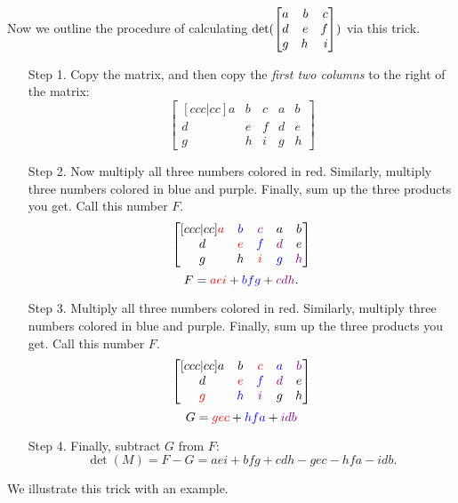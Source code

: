 Now we outline the procedure of calculating $\det(\mat{a & b & c \\ d & e & f \\ g & h & i}
)$ via this trick.

\begin{itemize}
	\item[Step 1. ] Copy the matrix, and then copy the \emph{first two columns} to
		the right of the matrix:
		\[
			\begin{bmatrix}
				[ccc|cc] a & b & c & a & b \\
				d          & e & f & d & e \\
				g          & h & i & g & h
			\end{bmatrix}
		\]

	\item[Step 2. ] Now multiply all three numbers colored in {\color{red} red}.
		Similarly, multiply three numbers colored in {\color{blue} blue} and {\color{violet} purple}.
		Finally, sum up the three products you get. Call this number $F$.
		\[
			\begin{bmatrix}
				[ccc|cc] {\color{red} a} & {\color{blue} b} & {\color{violet} c} & a                 & b                  \\
				d                        & {\color{red} e}  & {\color{blue} f}   & {\color{violet}d} & e                  \\
				g                        & h                & {\color{red} i}    & {\color{blue} g}  & {\color{violet} h}
			\end{bmatrix}
		\]
		\[
			F={\color{red} aei}+{\color{blue} bfg}+{\color{violet} cdh}.
		\]

	\item[Step 3. ] Multiply all three numbers colored in {\color{red} red}.
		Similarly, multiply three numbers colored in {\color{blue} blue} and {\color{violet} purple}.
		Finally, sum up the three products you get. Call this number $F$.
		\[
			\begin{bmatrix}
				[ccc|cc] a     & b               & {\color{red}c}    & {\color{blue} a}   & {\color{violet} b} \\
				d              & {\color{red}e}  & {\color{blue}f}   & {\color{violet} d} & e                  \\
				{\color{red}g} & {\color{blue}h} & {\color{violet}i} & g                  & h
			\end{bmatrix}
		\]
		\[
			G={\color{red} gec}+{\color{blue} hfa}+{\color{violet} idb}
		\]

	\item[Step 4. ] Finally, subtract $G$ from $F$:
		\[
			\det(M)=F-G=aei+bfg+cdh-gec-hfa-idb.
		\]
\end{itemize}
We illustrate this trick with an example.

